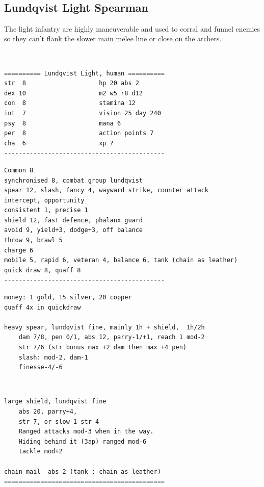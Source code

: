 \


\subsection*{Lundqvist Light Spearman}

The light infantry are highly maneuverable and used to corral and funnel enemies so they can't flank the slower main melee line or close on the archers.

\

\goodbreak \small \begin{samepage} \begin{verbatim}
========== Lundqvist Light, human ==========
str  8                    hp 20 abs 2
dex 10                    m2 w5 r8 d12
con  8                    stamina 12
int  7                    vision 25 day 240
psy  8                    mana 6
per  8                    action points 7
cha  6                    xp ?
--------------------------------------------
\end{verbatim} \end{samepage} \goodbreak \begin{samepage} \begin{verbatim}
Common 8
synchronised 8, combat group lundqvist
spear 12, slash, fancy 4, wayward strike, counter attack
intercept, opportunity
consistent 1, precise 1
shield 12, fast defence, phalanx guard
avoid 9, yield+3, dodge+3, off balance
throw 9, brawl 5
charge 6
mobile 5, rapid 6, veteran 4, balance 6, tank (chain as leather)
quick draw 8, quaff 8
--------------------------------------------
\end{verbatim} \end{samepage} \goodbreak \begin{samepage} \begin{verbatim}
money: 1 gold, 15 silver, 20 copper
quaff 4x in quickdraw

heavy spear, lundqvist fine, mainly 1h + shield,  1h/2h
    dam 7/8, pen 0/1, abs 12, parry-1/+1, reach 1 mod-2
    str 7/6 (str bonus max +2 dam then max +4 pen)
    slash: mod-2, dam-1
    finesse-4/-6
\end{verbatim} \end{samepage}   \   \goodbreak \begin{samepage} \begin{verbatim}
large shield, lundqvist fine
    abs 20, parry+4,
    str 7, or slow-1 str 4
    Ranged attacks mod-3 when in the way.
    Hiding behind it (3ap) ranged mod-6
    tackle mod+2

chain mail  abs 2 (tank : chain as leather)
============================================
\end{verbatim} \end{samepage} \normalsize

